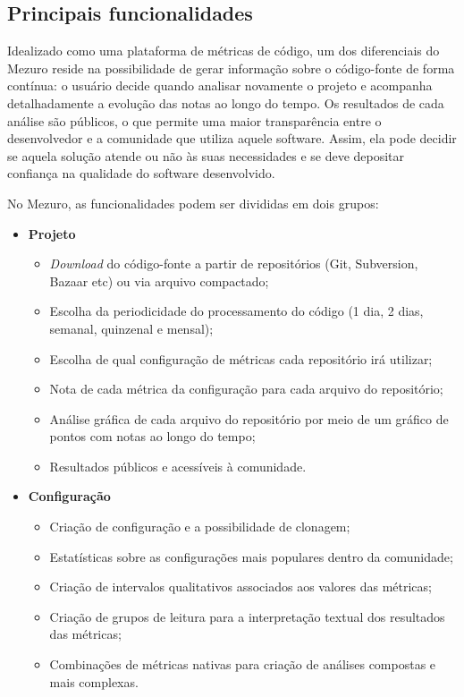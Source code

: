 \documentclass{llncs}
\begin{document}

\subsection{Principais funcionalidades}
\label{sec:funcionalidades}

Idealizado como uma plataforma de métricas de código, um dos diferenciais do
Mezuro reside na possibilidade de gerar informação sobre o código-fonte de
forma contínua: o usuário decide quando analisar novamente o projeto e
acompanha detalhadamente a evolução das notas ao longo do tempo.
%
Os resultados de cada análise são públicos, o que permite uma maior
transparência entre o desenvolvedor e a comunidade que utiliza aquele software.
Assim, ela pode decidir se aquela solução atende ou não às suas necessidades e
se deve depositar confiança na qualidade do software desenvolvido.

No Mezuro, as funcionalidades podem ser divididas em dois grupos:
\begin{itemize}

  \item \textbf{Projeto}
    \begin{itemize}
    \item \textit{Download} do código-fonte a partir de repositórios (Git, Subversion, Bazaar etc) ou via arquivo compactado;
        \item Escolha da periodicidade do processamento do código (1 dia, 2 dias, semanal, quinzenal e mensal);
        \item Escolha de qual configuração de métricas cada repositório irá utilizar;
        \item Nota de cada métrica da configuração para cada arquivo do repositório;
        \item Análise gráfica de cada arquivo do repositório por meio de um gráfico de pontos com notas ao longo do tempo;
        \item Resultados públicos e acessíveis à comunidade.
    \end{itemize}

    \item \textbf{Configuração}
    \begin{itemize}
    \item Criação de configuração e a possibilidade de clonagem;
        \item Estatísticas sobre as configurações mais populares dentro da comunidade;
        \item Criação de intervalos qualitativos associados aos valores das métricas;
        \item Criação de grupos de leitura para a interpretação textual dos resultados das métricas;
        \item Combinações de métricas nativas para criação de análises compostas e mais complexas.
    \end{itemize}

\end{itemize}
\end{document}
